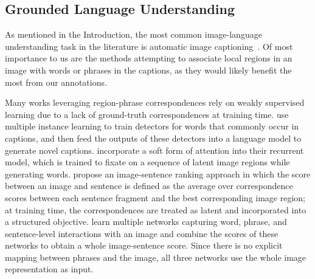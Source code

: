 \documentclass[twocolumn]{svjour3}
\begin{document}
\subsection{Grounded Language Understanding}

As mentioned in the Introduction, the most common image-language understanding task in the literature is automatic image captioning~\citep{chen2014learning,donahue2014long,fang2014captions,Farhadi10,Hodosh13,karpathy2014deep,kiros2014unifying,klein2014fisher,klein2015rnn,Kulkarni11,lebret2015phrase,ma2015,mao2014deep,Ordonez11,vinyals2014show,Yao2010}. Of most importance to us are the methods attempting to associate local regions in an image with words or phrases in the captions, as they would likely benefit the most from our annotations.

Many works leveraging region-phrase correspondences rely on weakly supervised learning due to a lack of ground-truth correspondences at training time.  \citet{fang2014captions} use multiple instance learning to train detectors for words that commonly occur in captions, and then feed the outputs of these detectors into a language model to generate novel captions. \citet{xu2015show} incorporate a soft form of attention into their recurrent model, which is trained to fixate on a sequence of latent image regions while generating words. \citet{karpathy2014deepNIPS,karpathy2014deep} propose an image-sentence ranking approach in which the score between an image and sentence is defined as the average over correspondence scores between each sentence fragment and the best corresponding image region; at training time, the correspondences are treated as latent and incorporated into a structured objective. \citet{ma2015} learn multiple networks capturing word, phrase, and sentence-level interactions with an image and combine the scores of these networks to obtain a whole image-sentence score.  Since there is no explicit mapping between phrases and the image, all three networks use the whole image representation as input. 
\end{document}

